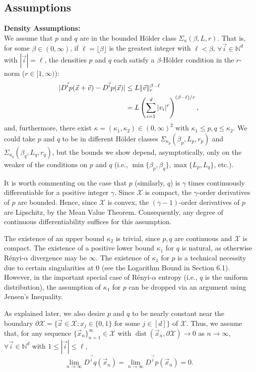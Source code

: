 \documentclass{article}
\newcommand{\N}{\mathbb{N}}                         %
\newcommand{\X}{\mathcal{X}}                        %
\newcommand{\vx}{\vec{x}}                           %
\newcommand{\vv}{\vec{v}}                           %
\newcommand{\vi}{{\vec{i}}}                         %
\newcommand{\dist}{\operatorname{dist}}             %
\begin{document}
\subsection{Assumptions}
\label{sec:Assumptions}
{\bf Density Assumptions:}\\
We assume that $p$ and $q$ are in the bounded H\"{o}lder class
$\Sigma_\kappa(\beta,L,r)$. That is, for some $\beta \in (0,\infty)$,
if $\ell = \lfloor \beta \rfloor$ is the greatest integer with
$\ell < \beta$, $\forall \vi \in \N^d$ with $|\vi| = \ell$,
the densities $p$ and $q$ each satisfy a $\beta$-H\"{o}lder condition in the
$r$-norm ($r \in [1,\infty)$):
\begin{align}
\notag
|D^\vi p(\vx + \vv) - D^\vi p(\vx)|
 &  \leq L\|\vv\|_r^{\beta - \ell}    \\
\label{ineq:holder_cond}
 &  = L\left( \sum_{i = 1}^d |v_i|^r \right)^{(\beta-\ell)/r},
\end{align}
and, furthermore, there exist $\kappa = (\kappa_1,\kappa_2) \in (0,\infty)^2$
with $\kappa_1 \leq p,q \leq \kappa_2$. We could take $p$ and $q$ to be in
different H\"{o}lder classes $\Sigma_{\kappa_p}(\beta_p,L_p,r_p)$
and $\Sigma_{\kappa_q}(\beta_q,L_q,r_q)$, but the bounds we show depend,
asymptotically, only on the weaker of the conditions on $p$ and $q$ (i.e.,
$\min\{\beta_p,\beta_q\}, \max\{L_p,L_q\}$, etc.).

It is worth commenting on the case that $p$ (similarly, $q$) is $\gamma$ times
continuously differentiable for a positive integer $\gamma$. Since $\X$ is
compact, the $\gamma$-order derivatives of $p$ are bounded. Hence, since $\X$
is convex, the $(\gamma - 1)$-order derivatives of $p$ are Lipschitz, by the
Mean Value Theorem. Consequently, any degree of continuous differentiability
suffices for this assumption.

The existence of an upper bound $\kappa_2$ is trivial, since $p,q$ are
continuous and $\X$ is compact. The existence of a positive lower bound
$\kappa_1$ for $q$ is natural, as otherwise R\'enyi-$\alpha$ divergence
may be $\infty$. The existence of $\kappa_1$ for $p$ is a technical necessity
due to certain singularities at $0$ (see the Logarithm Bound in Section 6.1).
However, in the important special case of R\'enyi-$\alpha$ entropy (i.e.,
$q$ is the uniform distribution), the assumption of $\kappa_1$ for $p$ can be
dropped via an argument using Jensen's Inequality.

As explained later, we also desire $p$ and $q$ to be nearly constant near the
boundary
$\partial \X = \{\vx \in \X : x_j \in \{0,1\} \mbox{ for some } j \in [d]\}$ of
$\X$. Thus, we assume that, for any sequence
$\{\vx_n\}_{n = 1}^\infty \in \X$ with $\dist(\vx_n,\partial \X) \to 0$ as
$n \to \infty$, $\forall \vi \in \N^d$ with $1 \leq |\vi| \leq \ell$,
\[
\lim_{n \to \infty} D^\vi q(\vx_n) = \lim_{n \to \infty} D^\vi p(\vx_n) = 0.
\]
\end{document}
